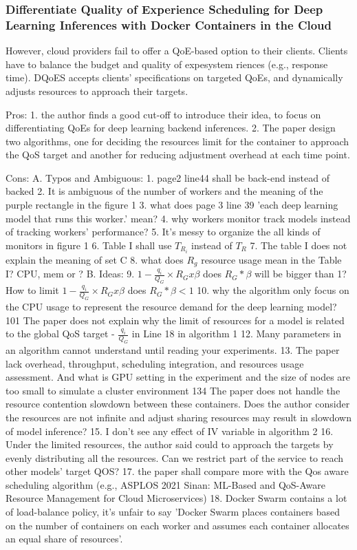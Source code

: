 \documentclass[UTF8]{article}
\begin{document}
\subsubsection{Differentiate Quality of Experience Scheduling for Deep Learning Inferences with Docker Containers in the Cloud}
However, cloud providers fail to offer a QoE-based option to their clients. Clients have to balance the budget and quality of expesystem
riences (e.g., response time). DQoES accepts clients’ specifications on targeted QoEs, and dynamically adjusts resources to approach their targets. 

Pros: 1. the author finds a good cut-off to introduce their idea, to focus on differentiating QoEs for deep learning backend inferences. 2. The paper design two algorithms, one for deciding the resources limit for the container to approach the QoS target and another for reducing adjustment overhead at each time point.

Cons: A. Typos and Ambiguous: 1. page2 line44 shall be back-end instead of backed 2. It is ambiguous of the number of workers and the meaning of the purple rectangle in the figure 1 3. what does page 3 line 39 'each deep learning model that runs this worker.' mean? 4. why workers monitor track models instead of tracking workers' performance? 5. It's messy to organize the all kinds of monitors in figure 1 6. Table I shall use $T_{R_i}$ instead of $T_R$ 7. The table I does not explain the meaning of set C 8. what does $R_g$ resource usage mean in the Table I? CPU, mem or ? B. Ideas: 9.  $1− \frac{q_i}{Q_G}×R_Gx\beta$ does $R_G*\beta$ will be bigger than 1? How to limit $1− \frac{q_i}{Q_G}×R_Gx\beta$ does $R_G*\beta < 1$  10. why the algorithm only focus on the CPU usage to represent the resource demand for the deep learning model? 101 The paper does not explain why the limit of resources for a model is related to the global QoS target - $\frac{q_i}{Q_G}$ in Line 18 in algorithm 1 12. Many parameters in an algorithm cannot understand until reading your experiments. 13. The paper lack overhead, throughput, scheduling integration, and resources usage assessment. And what is GPU setting in the experiment and the size of nodes are too small to simulate a cluster environment 134 The paper does not handle the resource contention slowdown between these containers. Does the author consider the resources are not infinite and adjust sharing resources may result in slowdown of model inference? 15. I don't see any effect of IV variable in algorithm 2 16. Under the limited resources, the author said could to approach the targets by evenly distributing all the resources. Can we restrict part of the service to reach other models' target QOS?  17. the paper shall compare more with the Qos aware scheduling algorithm (e.g., ASPLOS 2021 Sinan: ML-Based and QoS-Aware Resource Management for Cloud Microservices) 18. Docker Swarm contains a lot of load-balance policy,  it's unfair to say 'Docker Swarm places containers based on the number of containers on each worker and assumes each container allocates an equal share of resources'.  
\end{document}
